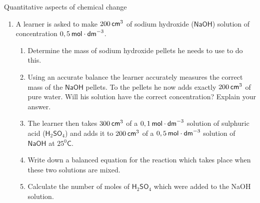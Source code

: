 \begin{eocexercises}{Quantitative aspects of chemical change}
\begin{enumerate}[noitemsep, label=\textbf{\arabic*}. ]
\label{m38712*id286663}\begin{enumerate}[noitemsep, label=\textbf{\alph*}. ] 
            \label{m38712*uid148}\item Write down a balanced equation for the reaction which takes place when these two solutions are mixed.
\label{m38712*uid149}\item Calculate the number of moles of sulphuric acid which were added to the sodium hydroxide solution.
\label{m38712*uid150}\item Is the number of moles of sulphuric acid enough to fully neutralise the sodium hydroxide solution? Support your answer by showing all relevant calculations.
(IEB Paper 2 2004)
\end{enumerate}
                \label{m38712*uid155}\item A learner is asked to make $200\phantom{\rule{2pt}{0ex}}{\mathsf{cm}}^{3}$ of sodium hydroxide ($\mathsf{NaOH}$) solution of concentration $0,5\phantom{\rule{2pt}{0ex}}\mathsf{mol}\ensuremath{\cdot}{\mathsf{dm}}^{-3}$.
\label{m38712*id286969}\begin{enumerate}[noitemsep, label=\textbf{\alph*}. ] 
            \label{m38712*uid156}\item Determine the mass of sodium hydroxide pellets he needs to use to do this.
\label{m38712*uid157}\item Using an accurate balance the learner accurately measures the correct mass of the $\mathsf{NaOH}$ pellets. To the pellets he now adds exactly $200\phantom{\rule{2pt}{0ex}}{\mathsf{cm}}^{3}$ of pure water. Will his solution have the correct concentration? Explain your answer.\item The learner then takes $300\phantom{\rule{2pt}{0ex}}{\mathsf{cm}}^{3}$ of a $0,1\phantom{\rule{2pt}{0ex}}\mathsf{mol}\ensuremath{\cdot}{\mathsf{dm}}^{-3}$ solution of sulphuric acid ($\mathsf{H}{}_{2}\mathsf{SO}{}_{4}$) and adds it to $200\phantom{\rule{2pt}{0ex}}{\mathsf{cm}}^{3}$ of a $0,5\phantom{\rule{2pt}{0ex}}\mathsf{mol}\ensuremath{\cdot}{\mathsf{dm}}^{-3}$ solution of $\mathsf{NaOH}$ at $25{}^{0}\mathsf{C}$.
\label{m38712*uid158}\item Write down a balanced equation for the reaction which takes place when these two solutions are mixed.
\label{m38712*uid159}\item Calculate the number of moles of $\mathsf{H}{}_{2}\mathsf{SO}{}_{4}$ which were added to the NaOH solution.

\end{enumerate}
\end{enumerate}
\end{eocexercises}
